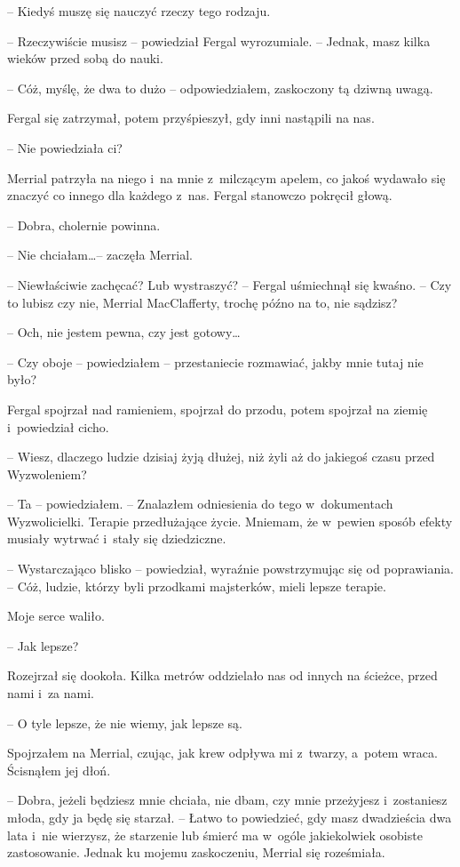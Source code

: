 \documentclass[oneside,polish,11pt,sfheadings]{mwbk}
\begin{document}
-- Kiedyś muszę się nauczyć rzeczy tego rodzaju.

-- Rzeczywiście musisz -- powiedział Fergal wyrozumiale. -- Jednak, masz
kilka wieków przed sobą do nauki.

-- Cóż, myślę, że dwa to dużo -- odpowiedziałem, zaskoczony tą dziwną
uwagą.

Fergal się zatrzymał, potem przyśpieszył, gdy inni nastąpili na nas.

-- Nie powiedziała ci?

Merrial patrzyła na niego i~na mnie z~milczącym apelem, co jakoś
wydawało się znaczyć co innego dla każdego z~nas. Fergal stanowczo
pokręcił głową.

-- Dobra, cholernie powinna.

-- Nie chciałam\ldots -- zaczęła Merrial.

-- Niewłaściwie zachęcać? Lub wystraszyć? -- Fergal uśmiechnął się kwaśno.
-- Czy to lubisz czy nie, Merrial MacClafferty, trochę późno na to, nie
sądzisz?

-- Och, nie jestem pewna, czy jest gotowy\ldots

-- Czy oboje -- powiedziałem -- przestaniecie rozmawiać, jakby mnie tutaj
nie było?

Fergal spojrzał nad ramieniem, spojrzał do przodu, potem spojrzał na
ziemię i~powiedział cicho.

-- Wiesz, dlaczego ludzie dzisiaj żyją dłużej, niż żyli aż do jakiegoś
czasu przed Wyzwoleniem?

-- Ta -- powiedziałem. -- Znalazłem odniesienia do tego w~dokumentach
Wyzwolicielki. Terapie przedłużające życie. Mniemam, że w~pewien sposób
efekty musiały wytrwać i~stały się dziedziczne.

-- Wystarczająco blisko -- powiedział, wyraźnie powstrzymując się od
poprawiania. -- Cóż, ludzie, którzy byli przodkami majsterków, mieli
lepsze terapie.

Moje serce waliło. 

-- Jak lepsze?

Rozejrzał się dookoła. Kilka metrów oddzielało nas od innych na ścieżce,
przed nami i~za nami.

-- O tyle lepsze, że nie wiemy, jak lepsze są.

Spojrzałem na Merrial, czując, jak krew odpływa mi z~twarzy, a~potem
wraca. Ścisnąłem jej dłoń.

-- Dobra, jeżeli będziesz mnie chciała, nie dbam, czy mnie przeżyjesz i~zostaniesz młoda, gdy ja będę się starzał. -- Łatwo to powiedzieć, gdy
masz dwadzieścia dwa lata i~nie wierzysz, że starzenie lub śmierć ma w~ogóle jakiekolwiek osobiste zastosowanie. Jednak ku mojemu zaskoczeniu,
Merrial się roześmiała.
\end{document}
